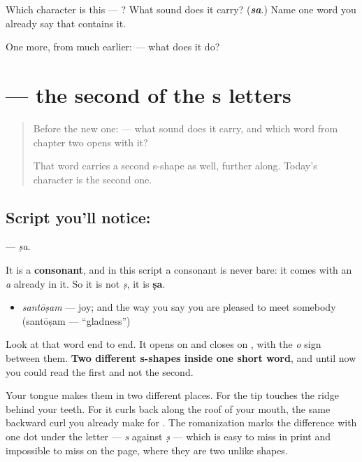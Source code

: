 \begin{tcolorbox}[breakable,colback=teal!4,colframe=teal!35!black,title={Before you move on}]
Which character is this — ? What sound does it carry? (\emph{\textbf{sa}}.) Name one word you already say that contains it.

One more, from much earlier:  — what does it do?
\end{tcolorbox}
\section[\texorpdfstring{\te{ష} (ṣa)}{ష (ṣa)}]{ — the second of the s letters}

\label{lesson:TE-S158-letter-ssa}



\begin{quote}
Before the new one:  — what sound does it carry, and which word from chapter two opens with it?

That word carries a second s-shape as well, further along. Today's character is the second one.
\end{quote}

\subsection*{Script you'll notice: }
\textbf{} — \emph{ṣa}.

It is a \textbf{consonant}, and in this script a consonant is never bare: it comes with an \emph{a} already in it. So it is not \emph{ṣ}, it is \textbf{ṣa}.

\begin{itemize}
\raggedright
  \item \textbf{} \emph{santōṣam} — joy; and the way you say you are pleased to meet somebody (santōṣam — \textquotedblleft{}gladness\textquotedblright{})
\end{itemize}

Look at that word end to end. It opens on  and closes on , with the \emph{o} sign between them. \textbf{Two different s-shapes inside one short word}, and until now you could read the first and not the second.

Your tongue makes them in two different places. For  the tip touches the ridge behind your teeth. For  it curls back along the roof of your mouth, the same backward curl you already make for . The romanization marks the difference with one dot under the letter — \emph{s} against \emph{ṣ} — which is easy to miss in print and impossible to miss on the page, where they are two unlike shapes.

